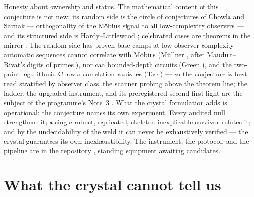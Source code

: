 \documentclass[11pt]{article}
\theoremstyle{remark}
\begin{document}
\noindent Honesty about ownership and status. The mathematical content of this conjecture is not
new: its random side is the circle of conjectures of Chowla \cite{Chowla} and Sarnak \cite{Sarnak}
--- orthogonality of the M\"obius signal to all low-complexity observers --- and its structured side
is Hardy--Littlewood \cite{HardyLittlewood}; celebrated cases are theorems in the mirror
\cite{SawinShusterman}. The random side has proven base camps at low observer complexity ---
automatic sequences cannot correlate with M\"obius (M\"ullner \cite{Mullner}, after
Mauduit--Rivat's digits of primes \cite{MauduitRivat}), nor can bounded-depth circuits (Green
\cite{GreenAC0}), and the two-point logarithmic Chowla correlation vanishes (Tao \cite{TaoChowla})
--- so the conjecture is best read stratified by observer class, the scanner probing above the
theorem line; the ladder, the upgraded instrument, and its preregistered second first light are
the subject of the programme's Note~3 \cite{Ladder}. What the crystal formulation adds is operational: the conjecture names its
own experiment. Every audited null strengthens it; a single robust, replicated,
skeleton-inexplicable survivor refutes it; and by the undecidability of the weld it can never be
exhaustively verified --- the crystal guarantees its own inexhaustibility. The instrument, the
protocol, and the pipeline are in the repository \cite{Code}, standing equipment awaiting
candidates.

\section{What the crystal cannot tell us}
\end{document}

